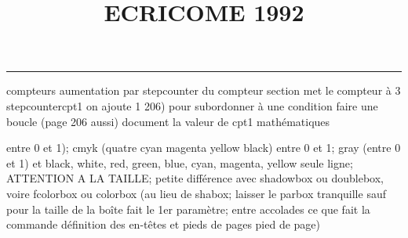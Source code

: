 \documentclass[11pt]{article}%
\title{\bf \vspace{-2cm} ECRICOME 1992} %
\author{} %
\date{} %
\renewcommand{\headrulewidth}{0pt}%
\renewcommand{\footrulewidth}{0.4pt}%
\begin{document}
\maketitle %
\vspace{-1.4cm}\hrule %
\thispagestyle{fancy}

\vspace*{.2cm}



compteurs%
aumentation par stepcounter du compteur section%
met le compteur à 3%
stepcounter{cpt1} on ajoute 1%
206) pour subordonner à une condition %
faire une boucle (page 206 aussi) %
document la valeur de cpt1 
mathématiques\newcommand{\ch}{\operatorname{ch}} 
\newcommand{\sh}{\operatorname{sh}}
\renewcommand{\tanh}{\operatorname{th}}
\renewcommand{\sinh}{\operatorname{sh}}
\renewcommand{\cosh}{\operatorname{ch}}
\newcommand{\argsh}{\operatorname{argsh}}
\newcommand{\argch}{\operatorname{argch}}
\newcommand{\argth}{\operatorname{argth}}
\newcommand{\Id}{\operatorname{Id}}
\renewcommand{\leq}{\leq}
\renewcommand{\geq}{\geq }

\newcommand{\dlim}{\lim}
\newcommand{\dsum}{\sum}
\newcommand{\dint}{\int}
\newcommand{\dprod}{\prod}



entre 0 et 1); cmyk (quatre cyan magenta yellow black) entre 0 et 1;
gray (entre 0 et 1) et black, white, red, green, blue, cyan, magenta,
yellow%
seule ligne; ATTENTION A LA TAILLE; petite différence avec shadowbox ou
doublebox, voire fcolorbox ou colorbox (au lieu de shabox; laisser le
parbox tranquille sauf pour la taille de la boîte
\newcommand{\Tbox}[1]{\begin{center} \shabox{\parbox{0.6
\linewidth}{#1}} \end{center}} %
fait le 1er paramètre; entre accolades ce que fait la commande
définition des en-têtes et pieds de pages\pagestyle{fancy}
\chead{}
\rfoot[ \ \thepage]{\thepage}
\cfoot{}
\lfoot{}
\thispagestyle{fancy} %
pied de page)\renewcommand{\footrulewidth}{0.4pt}
\renewcommand{\headrulewidth}{0.4pt}
\end{document}
